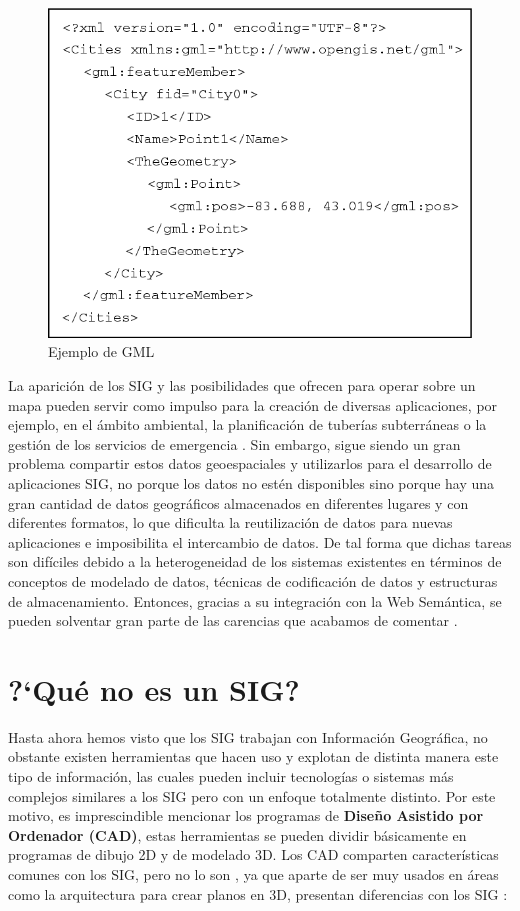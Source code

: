 \begin{figure}[H]
	\centering
	\includegraphics[width=0.71\linewidth]{imagenes/capitulo2/A-GML-representation-of-a-point-feature}
	\caption{Ejemplo de GML \cite{gml}}
	\label{fig:a-gml-representation-of-a-point-feature}
\end{figure}


La aparición de los SIG y las posibilidades que ofrecen para operar sobre un mapa pueden servir como impulso para la creación de diversas aplicaciones, por ejemplo, en el ámbito ambiental, la planificación de tuberías subterráneas o la gestión de los servicios de emergencia \cite{gisESRI}. Sin embargo, sigue siendo un gran problema compartir estos datos geoespaciales y utilizarlos para el desarrollo de aplicaciones SIG, no porque los datos no estén disponibles sino porque hay una gran cantidad de datos geográficos almacenados en diferentes lugares y con diferentes formatos, lo que dificulta la reutilización de datos para nuevas aplicaciones e imposibilita el intercambio de datos. De tal forma que dichas tareas son difíciles debido a la heterogeneidad de los sistemas existentes en términos de conceptos de modelado de datos, técnicas de codificación de datos y estructuras de almacenamiento. Entonces, gracias a su integración con la Web Semántica, se pueden solventar gran parte de las carencias que acabamos de comentar \cite{tesis}.

\section{?`Qué no es un SIG?}

Hasta ahora hemos visto que los SIG trabajan con Información Geográfica, no obstante existen herramientas que hacen uso y explotan de distinta manera este tipo de información, las cuales pueden incluir tecnologías o sistemas más complejos similares a los SIG pero con un enfoque totalmente distinto. Por este motivo, es imprescindible mencionar los programas de \textbf{Diseño Asistido por Ordenador (CAD)}, estas herramientas se pueden dividir básicamente en programas de dibujo 2D y de modelado 3D. Los CAD comparten características comunes con los SIG, pero no lo son \cite{VictorOlaya}, ya que aparte de ser muy usados en áreas como la arquitectura para crear planos en 3D, presentan diferencias con los SIG \cite{sig-cad}:

